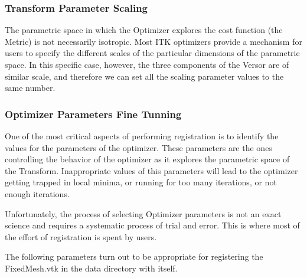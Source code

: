 \documentclass{InsightArticle}
\begin{document}
\begin{center}

\end{center}


\subsubsection{Transform Parameter Scaling}

The parametric space in which the Optimizer explores the cost function (the
Metric) is not necessarily isotropic.  Most ITK optimizers provide a mechanism
for users to specify the different scales of the particular dimensions of the
parametric space. In this specific case, however, the three components of the
Versor are of similar scale, and therefore we can set all the scaling parameter
values to the same number.

\begin{center}

\end{center}



\subsubsection{Optimizer Parameters Fine Tunning}

One of the most critical aspects of performing registration is to identify the
values for the parameters of the optimizer. These parameters are the ones
controlling the behavior of the optimizer as it explores the parametric space
of the Transform. Inappropriate values of this parameters will lead to the
optimizer getting trapped in local minima, or running for too many iterations,
or not enough iterations.

Unfortunately, the process of selecting Optimizer parameters is not an exact
science and requires a systematic process of trial and error. This is where
most of the effort of registration is spent by users.

The following parameters turn out to be appropriate for registering the
FixedMesh.vtk in the data directory with itself.

\begin{center}

\end{center}
\end{document}
